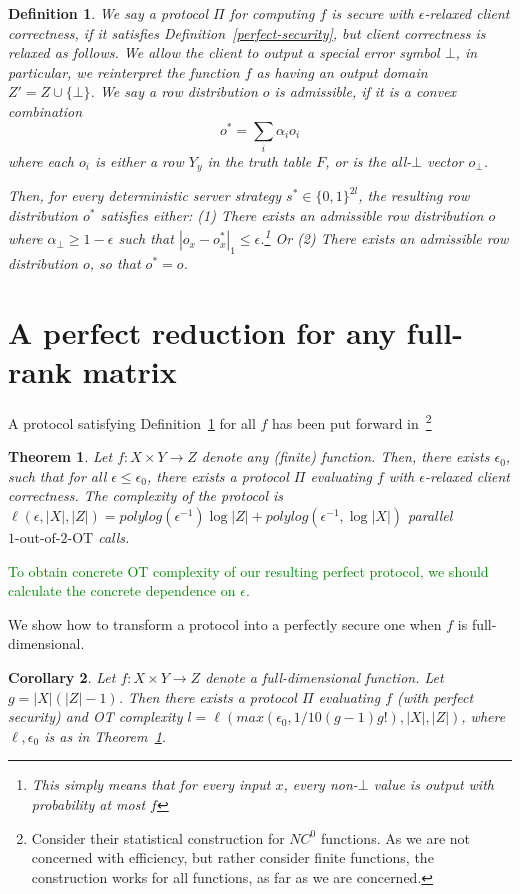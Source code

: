 \documentclass[a4paper]{article}
\newtheorem{definition}{Definition}[section]
\newtheorem{theorem}{Theorem}[section]
\newtheorem{corollary}[theorem]{Corollary}
\newcommand{\OT}[2]{#1\text{-out-of-}#2\text{-OT}}
\newcommand{\atodo}[1]{\textcolor{green}{#1}}
\begin{document}
\begin{definition}\label{weak-security}
We say a protocol $\Pi$ for computing $f$ is secure with $\epsilon$-relaxed client correctness, if it satisfies Definition~\ref{perfect-security}, but client correctness is relaxed as follows. We allow the client to output a special error symbol $\bot$, in particular, we reinterpret the function $f$ as having an output domain $Z'=Z\cup\{\bot\}$. 
We say a row distribution $o$ is admissible, if it is a convex combination 
\[o^* = \sum_i\alpha_io_i\]
where each $o_i$ is either a row $Y_y$ in the truth table $F$, or is the all-$\bot$ vector $o_\bot$. 

Then, for every deterministic server strategy $s^*\in\{0,1\}^{2l}$, the resulting row distribution $o^*$ satisfies either:
(1) There exists an admissible row distribution $o$ where $\alpha_\bot\geq 1-\epsilon$ such that $|o_x-o^*_x|_1\leq \epsilon$.\footnote{This simply means that for every input $x$, every non-$\bot$ value is output with probability at most $f$} Or  (2)
There exists an admissible row distribution $o$, so that $o^* = o$.
\end{definition}

\section{A perfect reduction for any full-rank matrix}
A protocol satisfying Definition~\ref{weak-security} for all $f$ has been put forward in~\cite{IKOPS}\footnote{Consider their statistical construction for $NC^0$ functions. As we are not concerned with efficiency, but rather consider finite functions, the construction works for all functions, as far as we are concerned.}

\begin{theorem}\label{thm-IVWD}
Let $f:X\times Y\rightarrow Z$ denote any (finite) function.
Then, there exists $\epsilon_0$, such that for all $\epsilon \leq \epsilon_0$, there exists a protocol $\Pi$  evaluating $f$ with $\epsilon$-relaxed client correctness. 
The complexity of the protocol is $\ell(\epsilon,|X|,|Z|)=polylog(\epsilon^{-1})\log|Z|+polylog(\epsilon^{-1},\log{|X|})$ parallel $\OT{1}{2}$ calls.
\end{theorem}
\atodo{To obtain concrete OT complexity of our resulting perfect protocol, we should calculate the concrete dependence on $\epsilon$.} 

We show how to transform a protocol into a perfectly secure one when $f$ is full-dimensional. 
\begin{corollary}
Let $f:X\times Y\rightarrow Z$ denote a full-dimensional function.
Let $g=|X|(|Z|-1)$.
Then there exists a protocol $\Pi$ evaluating $f$ (with perfect security)
and OT complexity $l=\ell(max(\epsilon_0,1/10(g-1)g!), |X|, |Z|)$, where $\ell,\epsilon_0$ is as in Theorem~\ref{thm-IVWD}.

\end{corollary}
\end{document}
